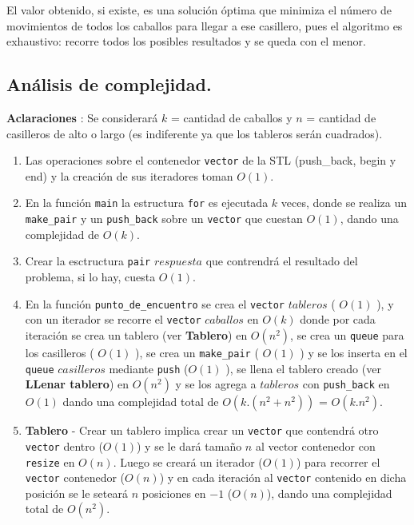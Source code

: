 El valor obtenido, si existe, es una solución óptima que minimiza el número
de movimientos de todos los caballos para llegar a ese casillero, pues el
algoritmo es exhaustivo: recorre todos los posibles resultados y se queda
con el menor.

\newpage
\subsection{Análisis de complejidad.}

\vspace*{0.3cm}

\textbf{Aclaraciones} : Se considerará $k$ = cantidad de caballos
 y $n$ = cantidad de casilleros de alto o largo (es indiferente ya que los
 tableros serán cuadrados).

\begin{enumerate}

 \item Las operaciones sobre el contenedor \verb|vector| de la STL (push_back, 
 begin y end) y la creación de sus iteradores toman $O(1)$.
 
 \item En la función \verb|main| la estructura \verb|for| es ejecutada
  $k$ veces, donde se realiza un \verb|make_pair| y un \verb|push_back| 
  sobre un \verb|vector| que cuestan $O(1)$, dando una complejidad de $O(k)$.
   
 \item Crear la esctructura \verb|pair| $respuesta$ que contrendrá el 
 resultado del problema, si lo hay, cuesta $O(1)$.
 
 \item En la función \verb|punto_de_encuentro| se crea el \verb|vector| 
 $tableros$ ( $O(1)$ ), y con un iterador se recorre el \verb|vector| $caballos$ en 
 $O(k)$ donde por cada iteración se crea un tablero (ver \textbf{Tablero}) 
 en $O(n^{2})$, se crea un \verb|queue| para los casilleros ( $O(1)$ ), 
 se crea un \verb|make_pair| ( $O(1)$ ) y se los inserta en el \verb|queue| $casilleros$
 mediante \verb|push| ($ O(1)$ ), se llena el tablero creado (ver \textbf{LLenar tablero}) 
 en $O(n^{2})$ y se los agrega a $tableros$ con \verb|push_back| en $O(1)$
  dando una complejidad total de $O(k.(n^{2} + n^{2}))$ = $O(k.n^{2})$.
 
 \item \textbf{Tablero} - Crear un tablero implica crear un \verb|vector| 
 que contendrá otro \verb|vector| dentro ($O(1)$) y se le dará tamaño $n$
 al vector contenedor con \verb|resize| en $O(n)$. Luego se creará un iterador
 ($O(1)$) para recorrer el \verb|vector| contenedor ($O(n)$) y en cada iteración
 al \verb|vector| contenido en dicha posición se le seteará $n$ posiciones
 en $-1$ ($O(n)$), dando una complejidad total de $O(n^{2})$.
 

\end{enumerate}
